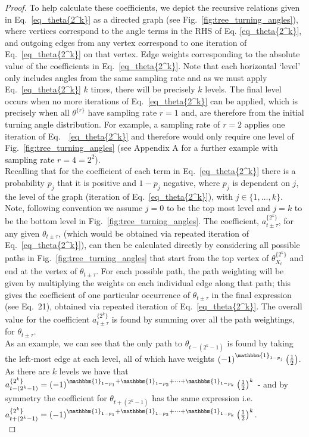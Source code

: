 \documentclass[english]{article}
\begin{document}
\begin{proof}
To help calculate these coefficients, we depict the recursive relations given in Eq.~\ref{eq_theta{2^k}} as a directed graph (see Fig.~\ref{fig:tree_turning_angles}), where vertices correspond to the angle terms in the RHS of Eq. \ref{eq_theta{2^k}}, and outgoing edges from any vertex correspond to one iteration of Eq.~\ref{eq_theta{2^k}} on that vertex. Edge weights corresponding to the absolute value of the coefficients in Eq.~\ref{eq_theta{2^k}}. Note that each horizontal `level' only includes angles from the same sampling rate and as we must apply Eq.~\ref{eq_theta{2^k}} $k$ times, there will be precisely $k$ levels.  The final level occurs when no more iterations of Eq.~\ref{eq_theta{2^k}} can be applied, which is precisely when all $\theta^{\{r\}}$ have sampling rate $r=1$ and, are therefore from the initial turning angle distribution. For example, a sampling rate of $r=2$ applies one iteration of Eq.~~\ref{eq_theta{2^k}} and therefore would only require one level of Fig.~\ref{fig:tree_turning_angles} (see Appendix A for a further example with sampling rate $r=4=2^2$).\\



Recalling that for the coefficient of each term in Eq.~\ref{eq_theta{2^k}} there is a probability $p_j$ that it is positive and $1-p_j$ negative, where $p_j$ is dependent on $j$, the level of the graph (iteration of Eq.~\ref{eq_theta{2^k}}), with $j\in\{1,\ldots,k\}$.  Note, following convention we assume $j=0$ to be the top most level and $j=k$ to be the bottom level in Fig.~\ref{fig:tree_turning_angles}. The coefficient, $a^{\{2^k\}}_{t\pm\tau}$, for any given $\theta_{t\pm\tau}$, (which would be obtained via repeated iteration of Eq.~\ref{eq_theta{2^k}}), can then be calculated directly by considering all possible paths in Fig.~\ref{fig:tree_turning_angles} that start from the top vertex of $\theta^{\{2^k\}}_{X_t}$ and end at the vertex of $\theta_{t\pm\tau}$. For each possible path, the path weighting will be given by multiplying the weights on each individual edge along that path; this gives the coefficient of one particular occurrence of $\theta_{t\pm\tau}$ in the final expression (see Eq.~21), obtained via repeated iteration of Eq.~\ref{eq_theta{2^k}}. The overall value for the coefficient $a^{\{2^k\}}_{t\pm\tau}$ is found by summing over all the path weightings, for $\theta_{t\pm\tau}$.\\


As an example, we can see that the only path to $\theta_{t-(2^k-1)}$ is found by taking the left-most edge at each level, all of which have weights $(-1)^{\mathbbm{1}_{1-p_j}}\left(\frac{1}{2}\right)$.  As there are $k$ levels we have that $a^{\{2^k\}}_{t-(2^k-1)}=(-1)^{\mathbbm{1}_{1-p_1}+\mathbbm{1}_{1-p_2}+\cdots+\mathbbm{1}_{1-p_k}}\left(\frac{1}{2}\right)^k$ - and by symmetry the coefficient for $\theta_{t+(2^k-1)}$ has the same expression i.e. $a^{\{2^k\}}_{t+(2^k-1)}=(-1)^{\mathbbm{1}_{1-p_1}+\mathbbm{1}_{1-p_2}+\cdots+\mathbbm{1}_{1-p_k}}\left(\frac{1}{2}\right)^k$. \\



\end{proof}
\end{document}
